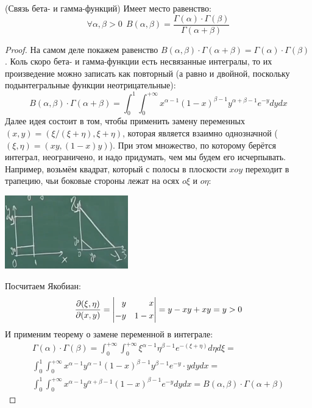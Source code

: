 \begin{theorem} (Связь бета- и гамма-функций)
	Имеет место равенство:
	\[
		\forall \alpha, \beta > 0\ \ B(\alpha, \beta) = \frac{\Gamma(\alpha) \cdot \Gamma(\beta)}{\Gamma(\alpha + \beta)}
	\]
\end{theorem}

\begin{proof}
	На самом деле покажем равенство $B(\alpha, \beta) \cdot \Gamma(\alpha + \beta) = \Gamma(\alpha) \cdot \Gamma(\beta)$. Коль скоро бета- и гамма-функции есть несвязанные интегралы, то их произведение можно записать как повторный (а равно и двойной, поскольку подынтегральные функции неотрицательные):
	\[
		B(\alpha, \beta) \cdot \Gamma(\alpha + \beta) = \int_0^1 \int_0^{+\infty} x^{\alpha - 1}(1 - x)^{\beta - 1}y^{\alpha + \beta - 1}e^{-y}dydx
	\]
	Далее идея состоит в том, чтобы применить замену переменных $(x, y) = (\xi / (\xi + \eta), \xi + \eta)$, которая является взаимно однозначной ($(\xi, \eta) = (xy, (1 - x)y)$). При этом множество, по которому берётся интеграл, неограничено, и надо придумать, чем мы будем его исчерпывать. Например, возьмём  квадрат, который с полосы в плоскости $xoy$ переходит в трапецию, чьи боковые стороны лежат на осях $o\xi$ и $o\eta$:
	\begin{center}
		\includegraphics[width=0.4\textwidth]{images/beta_function.png}
	\end{center}
	
	Посчитаем Якобиан:
	\[
		\frac{\partial (\xi, \eta)}{\partial (x, y)} = \left| \begin{aligned} 
			y& &x
			\\
			-y& &1 - x
		 \end{aligned} \right| = y - xy + xy = y > 0
	\]
	И применим теорему о замене переменной в интеграле:
	\begin{multline*}
		\Gamma(\alpha) \cdot \Gamma(\beta) = \int_0^{+\infty} \int_0^{+\infty} \xi^{\alpha - 1} \eta^{\beta - 1} e^{-(\xi + \eta)}d\eta d\xi =
		\\
		\int_0^1 \int_0^{+\infty} x^{\alpha - 1} y^{\alpha - 1} (1 - x)^{\beta - 1} y^{\beta - 1} e^{-y} \cdot ydydx =
		\\
		\int_0^1 \int_0^{+\infty} x^{\alpha - 1} y^{\alpha + \beta - 1} (1 - x)^{\beta - 1} e^{-y} dydx = B(\alpha, \beta) \cdot \Gamma(\alpha + \beta)
	\end{multline*}
\end{proof}

